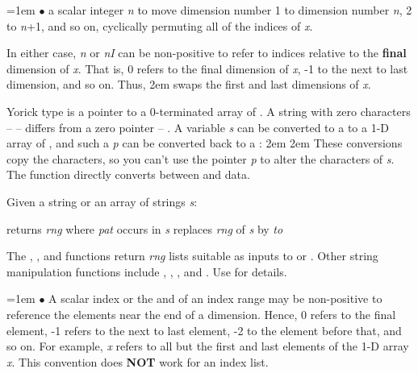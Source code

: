 \hangindent=1em
$\bullet$ a scalar integer {\it n} \hfil\break
to move dimension number 1 to dimension number {\it n\/}, 2 to {\it n\/}+1,
and so on, cyclically permuting all of the indices of {\it x}.

In either case, {\it n\/} or {\it nI\/} can be non-positive to refer to
indices relative to the {\bf final} dimension of {\it x}.  That is, 0 refers
to the final dimension of {\it x}, -1 to the next to last dimension, and so
on.  Thus, \hfil\break
\hglue2em  \hfil\break
swaps the first and last dimensions of {\it x}.


Yorick type  is a pointer to a 0-terminated
array of .  A string with zero characters --  -- differs
from a zero pointer -- .  A  variable {\it s\/}
can be converted to a  to a 1-D array of , and such
a  {\it p\/} can be converted back to a :
\begindemo
\hglue2em 
\hglue2em 
\enddemo
These conversions copy the characters, so you can't use the pointer {\it p\/}
to alter the characters of {\it s}.  The  function directly
converts between  and   data.

Given a string or an array of strings {\it s\/}:

          {returns {\it rng\/} where {\it pat} occurs in {\it s\/}}
          {replaces {\it rng\/} of {\it s\/} by {\it to}}

The , , and  functions return
{\it rng} lists suitable as inputs to  or .
Other string manipulation functions include , ,
, and .  Use  for details.


\hangindent=1em
$\bullet$ A scalar index or the  and  of an index
range may be non-positive to reference the elements near the end of a
dimension.  Hence, 0 refers to the final element, -1 refers to the next
to last element, -2 to the element before that, and so on.  For example,
{\it x\/} refers to all but the first and last elements of
the 1-D array {\it x}.  This convention does {\bf NOT} work for an index
list.

